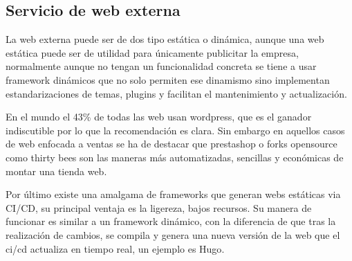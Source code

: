 \subsection{Servicio de web externa}
La web externa puede ser de dos tipo estática o dinámica, aunque una web estática puede ser de utilidad para únicamente publicitar la empresa, normalmente aunque no tengan un funcionalidad concreta se tiene a usar framework dinámicos que no solo permiten ese dinamismo sino implementan estandarizaciones de temas, plugins y facilitan el mantenimiento y actualización.

 En el mundo el 43\%\cite{c_porcentaje_wordpress} de todas las web usan wordpress\cite{c_wordpress}, que es el ganador indiscutible por lo que la recomendación es clara. Sin embargo en aquellos casos de web enfocada a ventas se ha de destacar que prestashop\cite{c_prestashop} o forks opensource como thirty bees\cite{c_bees} son las maneras más automatizadas, sencillas y económicas de montar una tienda web.

Por último existe una amalgama de frameworks que generan webs estáticas via CI/CD, su principal ventaja es la ligereza, bajos recursos. Su manera de funcionar es similar a un framework dinámico, con la diferencia de que tras la realización de cambios, se compila y genera una nueva versión de la web que el ci/cd actualiza en tiempo real, un ejemplo es Hugo\cite{c_hugo}.

